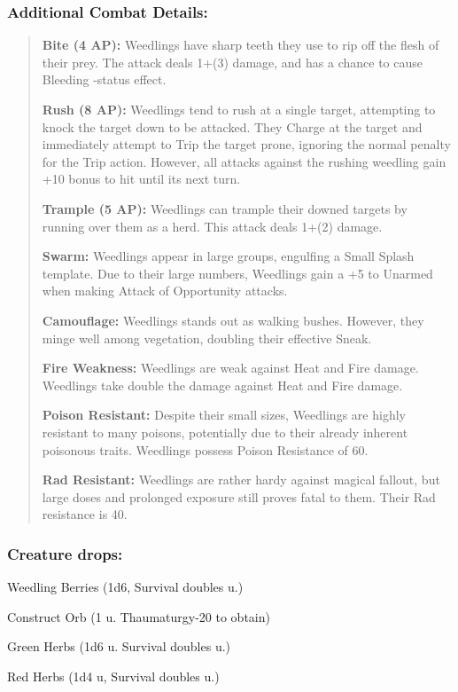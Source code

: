 \documentclass[11pt,a4paper,twocolumn]{book}
\begin{document}
	\subsubsection*{Additional Combat Details:}
	\begin{verse}
		\textbf{Bite (4 AP):} Weedlings have sharp teeth they use to rip off the flesh of their prey. The attack deals 1+(3) damage, and has a chance to cause Bleeding -status effect.
		
		\textbf{Rush (8 AP):} Weedlings tend to rush at a single target, attempting to knock the target down to be attacked. They Charge at the target and immediately attempt to Trip the target prone, ignoring the normal penalty for the Trip action. However, all attacks against the rushing weedling gain +10 bonus to hit until its next turn.
		
		\textbf{Trample (5 AP):} Weedlings can trample their downed targets by running over them as a herd. This attack deals 1+(2) damage.
		
		\textbf{Swarm:} Weedlings appear in large groups, engulfing a Small Splash template. Due to their large numbers, Weedlings gain a +5 to Unarmed when making Attack of Opportunity attacks. 
		
		\textbf{Camouflage:} Weedlings stands out as walking bushes. However, they minge well among vegetation, doubling their effective Sneak.
		
		\textbf{Fire Weakness:} Weedlings are weak against Heat and Fire damage. Weedlings take double the damage against Heat and Fire damage.
		
		\textbf{Poison Resistant:} Despite their small sizes, Weedlings are highly resistant to many poisons, potentially due to their already inherent poisonous traits. Weedlings possess Poison Resistance of 60.
		
		\textbf{Rad Resistant:} Weedlings are rather hardy against magical fallout, but large doses and prolonged exposure still proves fatal to them. Their Rad resistance is 40.
	\end{verse}
	
	\subsubsection*{Creature drops:}
	\begin{compactitem}
		\item Weedling Berries (1d6, Survival doubles u.)
		\item Construct Orb (1 u. Thaumaturgy-20 to obtain)
		\item Green Herbs (1d6 u. Survival doubles u.)
		\item Red Herbs (1d4 u, Survival doubles u.)
	\end{compactitem}
	
\end{document}

